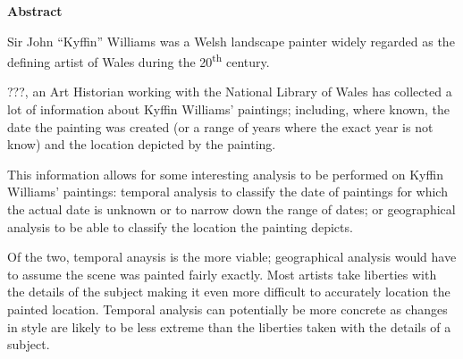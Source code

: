 \thispagestyle{empty}

\begin{center}
    {\LARGE\bf Abstract}
\end{center}

Sir John ``Kyffin'' Williams was a Welsh landscape painter widely regarded as the defining artist of Wales during the 20\textsuperscript{th} century.

???, an Art Historian working with the National Library of Wales has collected a lot of information about Kyffin Williams' paintings; including, where known, the date the painting was created (or a range of years where the exact year is not know) and the location depicted by the painting. 

This information allows for some interesting analysis to be performed on Kyffin Williams' paintings: temporal analysis to classify the date of paintings for which the actual date is unknown or to narrow down the range of dates; or geographical analysis to be able to classify the location the painting depicts.

Of the two, temporal anaysis is the more viable; geographical analysis would have to assume the scene was painted fairly exactly. Most artists take liberties with the details of the subject making it even more difficult to accurately location the painted location. Temporal analysis can potentially be more concrete as changes in style are likely to be less extreme than the liberties taken with the details of a subject.


